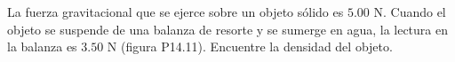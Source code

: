 \item La fuerza gravitacional que se ejerce sobre un objeto sólido es $5.00 \text{ N}$. Cuando el objeto se suspende de una balanza de resorte y se sumerge en agua, la lectura en la balanza es $3.50 \text{ N}$ (figura P14.11). Encuentre la densidad del objeto.

